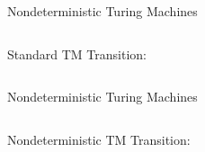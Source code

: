 \documentclass[c]{beamer}
\begin{document}





\begin{frame}{Nondeterministic Turing Machines}

  \begin{columns}

    Standard TM Transition:
       

    \begin{center}
      \detercomptm{}
    \end{center}
  \end{columns}
\end{frame}


\begin{frame}{Nondeterministic Turing Machines}

  \begin{columns}

    Nondeterministic TM Transition:
       

    \begin{center}
      \scaletopagewidth{\ndetercomptm{}}
    \end{center}
  \end{columns}
\end{frame}




  



  
\end{document}
